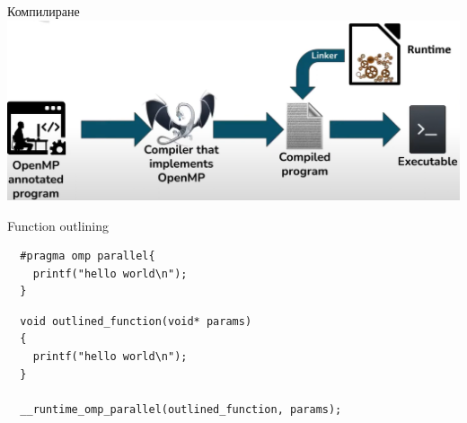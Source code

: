\documentclass{beamer}
\begin{document}
\begin{frame}{Компилиране}
  \includegraphics[width=\textwidth]{compilaton-process.png}
\end{frame}

\begin{frame}[fragile]{Function outlining}
  \lstset{language=C++}
\begin{lstlisting}
  #pragma omp parallel{
    printf("hello world\n");
  }
\end{lstlisting}

\begin{lstlisting}
  void outlined_function(void* params)
  {
    printf("hello world\n");
  }

  __runtime_omp_parallel(outlined_function, params);
\end{lstlisting}

\end{frame}
\end{document}
